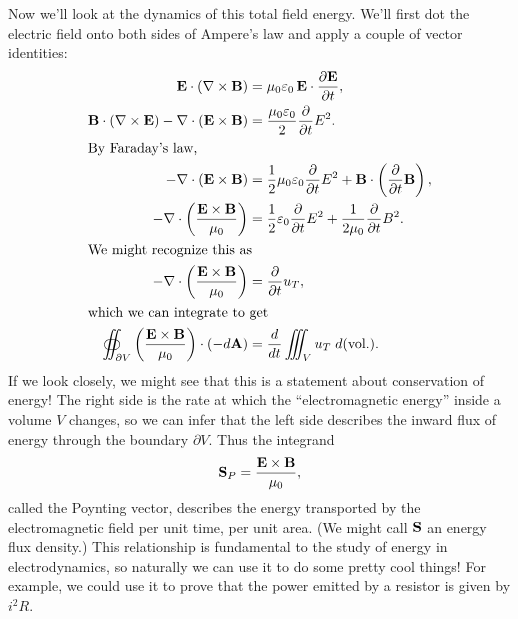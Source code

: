 \documentclass[../p051main.tex]{subfiles}
\begin{document}
Now we'll look at the dynamics of this total field energy.
We'll first dot the electric field onto both sides of Ampere's law and apply a couple of vector identities:
\begin{align*}
    \mathbf{E} \cdot (\nabla \times \mathbf{B}) &= \mu_0 \varepsilon_0 \,\mathbf{E} \cdot \frac{\partial \mathbf{E}}{\partial t}, \\
    \mathbf{B} \cdot (\nabla \times \mathbf{E}) - \nabla \cdot (\mathbf{E} \times \mathbf{B}) &= \frac{\mu_0 \varepsilon_0}{2} \frac{\partial}{\partial t} E^2. \\
    \intertext{By Faraday's law,}
    -\nabla \cdot (\mathbf{E} \times \mathbf{B}) &= \frac{1}{2} \mu_0 \varepsilon_0 \frac{\partial}{\partial t} E^2 + \mathbf{B} \cdot \left( \frac{\partial}{\partial t} \mathbf{B} \right), \\
    -\nabla \cdot \left( \frac{\mathbf{E} \times \mathbf{B}}{\mu_0} \right) &= \frac{1}{2} \varepsilon_0 \frac{\partial}{\partial t} E^2 + \frac{1}{2\mu_0} \frac{\partial}{\partial t} B^2. \\
    \intertext{We might recognize this as}
    -\nabla \cdot \left( \frac{\mathbf{E} \times \mathbf{B}}{\mu_0} \right) &= \frac{\partial}{\partial t} u_T, \\
    \intertext{which we can integrate to get}
    \oiint_{\partial V} \left( \frac{\mathbf{E} \times \mathbf{B}}{\mu_0} \right) \cdot (-d\mathbf{A}) &= \frac{d}{dt} \iiint_V u_T \;d(\textrm{vol.}).
\end{align*}
If we look closely, we might see that this is a statement about conservation of energy!
The right side is the rate at which the ``electromagnetic energy'' inside a volume $V$ changes, so we can infer that the left side describes the inward flux of energy through the boundary $\partial V$.
Thus the integrand
\[ \mathbf{S}_P = \frac{\mathbf{E} \times \mathbf{B}}{\mu_0}, \]
called the Poynting vector, describes the energy transported by the electromagnetic field per unit time, per unit area.
(We might call $\mathbf{S}$ an energy flux density.)
This relationship is fundamental to the study of energy in electrodynamics, so naturally we can use it to do some pretty cool things!
For example, we could use it to prove that the power emitted by a resistor is given by $i^2 R$.
\end{document}
